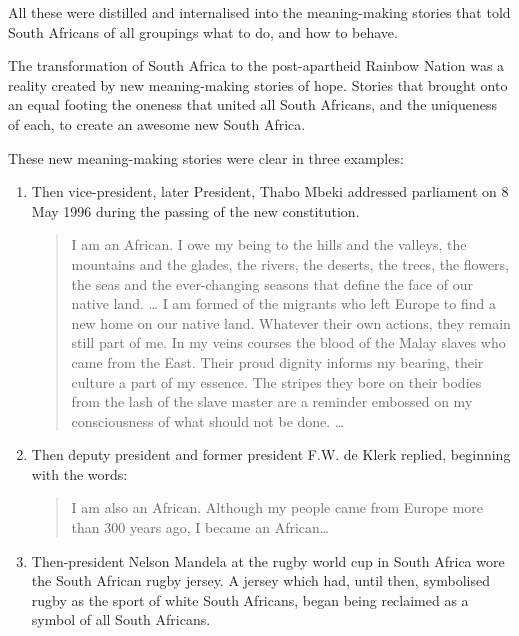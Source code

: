 All these were distilled and internalised into the meaning-making stories that told South Africans of all groupings what to do, and how to behave.


The transformation of South Africa to the post-apartheid Rainbow Nation was a reality created by new meaning-making stories of hope. Stories that brought onto an equal footing the oneness that united all South Africans, and the uniqueness of each, to create an awesome new South Africa.


These new meaning-making stories were clear in three examples:


\begin{enumerate}
\item Then vice-president, later President, Thabo Mbeki  addressed parliament on 8 May 1996 during the passing of the new constitution\cite{mbeki-I-am-an-african}. 
\begin{quote} 
I am an African. I owe my being to the hills and the valleys, the mountains and the glades, the rivers, the deserts, the trees, the flowers, the seas and the ever-changing seasons that define the face of our native land. \ldots
I am formed of the migrants who left Europe to find a new home on our native land. Whatever their own actions, they remain still part of me.
In my veins courses the blood of the Malay slaves who came from the East. Their proud dignity informs my bearing, their culture a part of my essence. The stripes they bore on their bodies from the lash of the slave master are a reminder embossed on my consciousness of what should not be done. \ldots 
\end{quote} 


\item Then deputy president and former president F.W. de Klerk  replied, beginning with the words: \begin{quote} I am also an African. Although my people came from Europe more than 300 years ago, I became an African\dots\cite{deklerk-I-am-also-an-african}\end{quote}


\item Then-president Nelson Mandela  at the rugby world cup in South Africa wore the South African rugby jersey. A jersey which had, until then, symbolised rugby as the sport of white South Africans, began being reclaimed as a symbol of all South Africans.
\end{enumerate}



